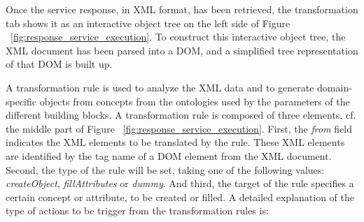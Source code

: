 Once the service response, in XML format, has been retrieved, the transformation tab shows it as an interactive object tree on the left side of Figure ~\ref{fig:response_service_execution}. To construct this interactive object tree, the XML document has been parsed into a DOM, and a simplified tree representation of that DOM is built up. 

A transformation rule is used to analyze the XML data and to generate domain-specific objects from concepts from the ontologies used by the parameters of the different building blocks. A transformation rule is composed of three elements, cf. the middle part of Figure ~\ref{fig:response_service_execution}. First, the \textit{from} field indicates the XML elements to be translated by the rule. These XML elements are identified by the tag name of a DOM element from the XML document. Second, the type of the rule will be set, taking one of the following values: \emph{createObject}, \emph{fillAttributes} or \emph{dummy}. And third, the target of the rule specifies a certain concept or attribute, to be created or filled. A detailed explanation of the type of actions to be trigger from the transformation rules is:
